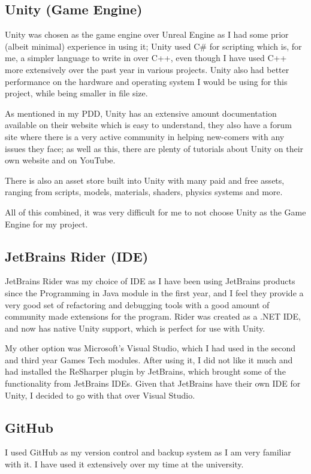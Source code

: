 \documentclass[12pt]{report}
\begin{document}
\subsection{Unity (Game Engine)}
Unity was chosen as the game engine over Unreal Engine as I had some prior (albeit minimal) experience in using it; Unity used C\# for scripting which is, for me, a simpler language to write in over C++, even though I have used C++ more extensively over the past year in various projects. Unity also had better performance on the hardware and operating system I would be using for this project, while being smaller in file size.

As mentioned in my PDD, Unity has an extensive amount documentation available on their website which is easy to understand, they also have a forum site where there is a very active community in helping new-comers with any issues they face; as well as this, there are plenty of tutorials about Unity on their own website and on YouTube.

There is also an asset store built into Unity with many paid and free assets, ranging from scripts, models, materials, shaders, physics systems and more.

All of this combined, it was very difficult for me to not choose Unity as the Game Engine for my project.

\subsection{JetBrains Rider (IDE)}
JetBrains Rider was my choice of IDE as I have been using JetBrains products since the Programming in Java module in the first year, and I feel they provide a very good set of refactoring and debugging tools with a good amount of community made extensions for the program. Rider was created as a .NET IDE, and now has native Unity support, which is perfect for use with Unity.

My other option was Microsoft's Visual Studio, which I had used in the second and third year Games Tech modules. After using it, I did not like it much and had installed the ReSharper plugin by JetBrains, which brought some of the functionality from JetBrains IDEs. Given that JetBrains have their own IDE for Unity, I decided to go with that over Visual Studio.

\subsection{GitHub}
I used GitHub as my version control and backup system as I am very familiar with it. I have used it extensively over my time at the university.
\end{document}
